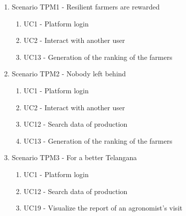 \begin{enumerate}[label=]
    \item Scenario TPM1 - Resilient farmers are rewarded
    \begin{enumerate}[label=]
        \item UC1 - Platform login
        \item UC2 - Interact with another user
        \item UC13 - Generation of the ranking of the farmers
    \end{enumerate}
    \item Scenario TPM2 - Nobody left behind
    \begin{enumerate}[label=]
        \item UC1 - Platform login
        \item UC2 - Interact with another user
        \item UC12 - Search data of production
        \item UC13 - Generation of the ranking of the farmers
    \end{enumerate}
    \item Scenario TPM3 - For a better Telangana
    \begin{enumerate}[label=]
        \item UC1 - Platform login
        \item UC12 - Search data of production
        \item UC19 - Visualize the report of an agronomist’s visit
    \end{enumerate}
\end{enumerate}
